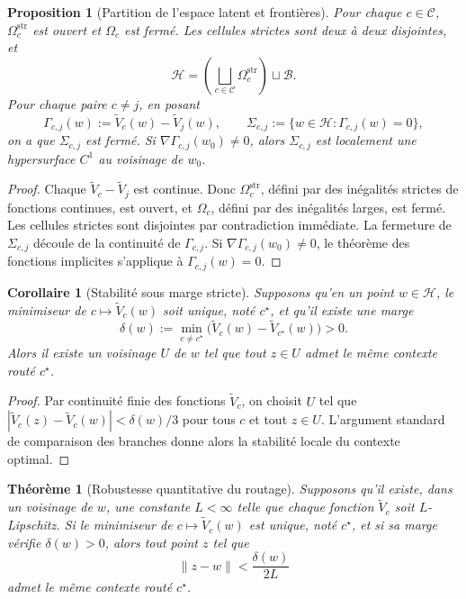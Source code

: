 \documentclass[11pt,a4paper]{article}
\newtheorem{proposition}{Proposition}[section]
\newtheorem{theorem}{Théorème}[section]
\newtheorem{corollary}{Corollaire}[section]
\newcommand{\Hh}{\mathcal H}
\newcommand{\Ccal}{\mathcal C}
\newcommand{\Bcal}{\mathcal B}
\begin{document}
\begin{proposition}[Partition de l'espace latent et frontières]
Pour chaque \(c\in\Ccal\), \(\Omega_c^{\mathrm{str}}\) est ouvert et \(\Omega_c\) est fermé. Les cellules strictes sont deux à deux disjointes, et
\[
\Hh=\left(\bigsqcup_{c\in\Ccal}\Omega_c^{\mathrm{str}}\right)\sqcup \Bcal.
\]
Pour chaque paire \(c\neq j\), en posant
\[
\Gamma_{c,j}(w):=\widetilde V_c(w)-\widetilde V_j(w),
\qquad
\Sigma_{c,j}:=\{w\in\Hh:\Gamma_{c,j}(w)=0\},
\]
on a que \(\Sigma_{c,j}\) est fermé. Si \(\nabla\Gamma_{c,j}(w_0)\neq 0\), alors \(\Sigma_{c,j}\) est localement une hypersurface \(C^1\) au voisinage de \(w_0\).
\end{proposition}

\begin{proof}
Chaque \(\widetilde V_c-\widetilde V_j\) est continue. Donc \(\Omega_c^{\mathrm{str}}\), défini par des inégalités strictes de fonctions continues, est ouvert, et \(\Omega_c\), défini par des inégalités larges, est fermé. Les cellules strictes sont disjointes par contradiction immédiate. La fermeture de \(\Sigma_{c,j}\) découle de la continuité de \(\Gamma_{c,j}\). Si \(\nabla\Gamma_{c,j}(w_0)\neq 0\), le théorème des fonctions implicites s'applique à \(\Gamma_{c,j}(w)=0\).
\end{proof}

\begin{corollary}[Stabilité sous marge stricte]
Supposons qu'en un point \(w\in\Hh\), le minimiseur de \(c\mapsto\widetilde V_c(w)\) soit unique, noté \(c^\star\), et qu'il existe une marge
\[
\delta(w):=\min_{c\neq c^\star}\bigl(\widetilde V_c(w)-\widetilde V_{c^\star}(w)\bigr)>0.
\]
Alors il existe un voisinage \(U\) de \(w\) tel que tout \(z\in U\) admet le même contexte routé \(c^\star\).
\end{corollary}

\begin{proof}
Par continuité finie des fonctions \(\widetilde V_c\), on choisit \(U\) tel que \(|\widetilde V_c(z)-\widetilde V_c(w)|<\delta(w)/3\) pour tous \(c\) et tout \(z\in U\). L'argument standard de comparaison des branches donne alors la stabilité locale du contexte optimal.
\end{proof}

\begin{theorem}[Robustesse quantitative du routage]
Supposons qu'il existe, dans un voisinage de \(w\), une constante \(L<\infty\) telle que chaque fonction \(\widetilde V_c\) soit \(L\)-Lipschitz. Si le minimiseur de \(c\mapsto\widetilde V_c(w)\) est unique, noté \(c^\star\), et si sa marge vérifie \(\delta(w)>0\), alors tout point \(z\) tel que
\[
\|z-w\|<\frac{\delta(w)}{2L}
\]
admet le même contexte routé \(c^\star\).
\end{theorem}
\end{document}
